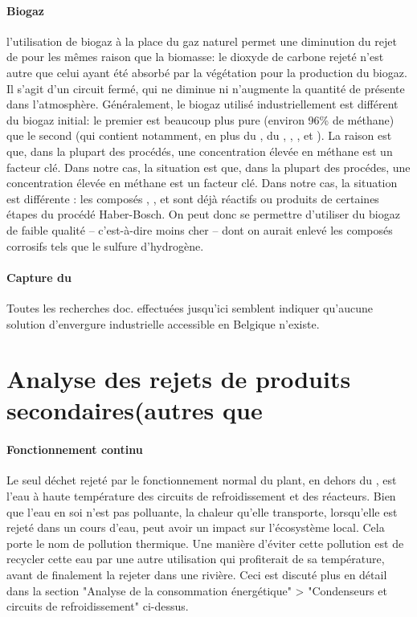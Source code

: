 \documentclass[10pt,a4paper]{report}
\begin{document}
\paragraph{Biogaz}
l'utilisation de biogaz à la place du gaz naturel permet une diminution du rejet de  pour les mêmes raison que la biomasse: le dioxyde de carbone rejeté n'est autre que celui ayant été absorbé par la végétation pour la production du biogaz. Il s'agit d'un circuit fermé, qui ne diminue ni n'augmente la quantité de  présente dans l'atmosphère.
Généralement, le biogaz utilisé industriellement est différent du biogaz initial: le premier est beaucoup plus pure (environ 96\% de méthane) que le second (qui contient notamment, en plus du , du , , ,  et ). La raison est que, dans la plupart des procédés, une concentration élevée en méthane est un facteur clé. Dans notre cas, la situation est que, dans la plupart des procédes, une concentration élevée en méthane est un facteur clé. Dans notre cas, la situation est différente : les composés , ,  et  sont déjà réactifs ou produits de certaines étapes du procédé Haber-Bosch. On peut donc se permettre d'utiliser du biogaz de faible qualité -- c'est-à-dire moins cher -- dont on aurait enlevé les composés corrosifs tels que le sulfure d'hydrogène.
\paragraph{Capture du }
Toutes les recherches doc. effectuées jusqu'ici semblent indiquer qu'aucune solution d'envergure industrielle accessible en Belgique n'existe.
\section{Analyse des rejets de produits secondaires(autres que }
\paragraph{Fonctionnement continu}
Le seul déchet rejeté par le fonctionnement normal du plant, en dehors du , est l'eau à haute température des circuits de refroidissement et des réacteurs. Bien que l'eau en soi n'est pas polluante, la chaleur qu'elle transporte, lorsqu'elle est rejeté dans un cours d'eau, peut avoir un impact sur l'écosystème local. Cela porte le nom de pollution thermique.
Une manière d'éviter cette pollution est de recycler cette eau par une autre utilisation qui profiterait de sa température, avant de finalement la rejeter dans une rivière. Ceci est discuté plus en détail dans la section "Analyse de la consommation énergétique" > "Condenseurs et circuits de refroidissement" ci-dessus.
\end{document}
